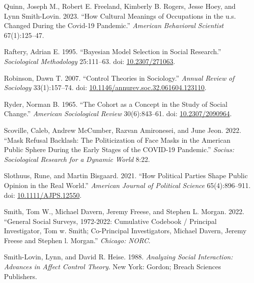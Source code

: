 \documentclass[
  12pt,
]{article}
\newlength{\cslhangindent}
\newlength{\cslentryspacingunit} %
\newenvironment{CSLReferences}[2] %
 {%
  \setlength{\parindent}{0pt}
  \ifodd #1
  \let\oldpar\par
  \def\par{\hangindent=\cslhangindent\oldpar}
  \fi
  \setlength{\parskip}{#2\cslentryspacingunit}
 }%
 {}
\begin{document}
\begin{CSLReferences}{1}{0}
\leavevmode{}%
Quinn, Joseph M., Robert E. Freeland, Kimberly B. Rogers, Jesse Hoey,
and Lynn Smith-Lovin. 2023. {``How Cultural Meanings of Occupations in
the u.s. Changed During the Covid-19 Pandemic.''} \emph{American
Behavioral Scientist} 67(1):125--47.

\leavevmode{}%
Raftery, Adrian E. 1995. {``Bayesian {Model} {Selection} in {Social}
{Research}.''} \emph{Sociological Methodology} 25:111--63. doi:
\href{https://doi.org/10.2307/271063}{10.2307/271063}.

\leavevmode{}%
Robinson, Dawn T. 2007. {``Control {Theories} in {Sociology}.''}
\emph{Annual Review of Sociology} 33(1):157--74. doi:
\href{https://doi.org/10.1146/annurev.soc.32.061604.123110}{10.1146/annurev.soc.32.061604.123110}.

\leavevmode{}%
Ryder, Norman B. 1965. {``The {Cohort} as a {Concept} in the {Study} of
{Social} {Change}.''} \emph{American Sociological Review} 30(6):843--61.
doi: \href{https://doi.org/10.2307/2090964}{10.2307/2090964}.

\leavevmode{}%
Scoville, Caleb, Andrew McCumber, Razvan Amironesei, and June Jeon.
2022. {``Mask {Refusal} {Backlash}: {The} {Politicization} of {Face}
{Masks} in the {American} {Public} {Sphere} During the {Early} {Stages}
of the {COVID}-19 {Pandemic}.''} \emph{Socius: Sociological Research for
a Dynamic World} 8:22.

\leavevmode{}%
Slothuus, Rune, and Martin Bisgaard. 2021. {``How {Political} {Parties}
{Shape} {Public} {Opinion} in the {Real} {World}.''} \emph{American
Journal of Political Science} 65(4):896--911. doi:
\href{https://doi.org/10.1111/AJPS.12550}{10.1111/AJPS.12550}.

\leavevmode{}%
Smith, Tom W., Michael Davern, Jeremy Freese, and Stephen L. Morgan.
2022. {``General Social Surveys, 1972-2022: Cumulative Codebook /
Principal Investigator, Tom w. Smith; Co-Principal Investigators,
Michael Davern, Jeremy Freese and Stephen l. Morgan.''} \emph{Chicago:
NORC}.

\leavevmode{}%
Smith-Lovin, Lynn, and David R. Heise. 1988. \emph{Analyzing {Social}
{Interaction}: {Advances} in {Affect} {Control} {Theory}}. New York:
Gordon; Breach Sciences Publishers.


\end{CSLReferences}
\end{document}
